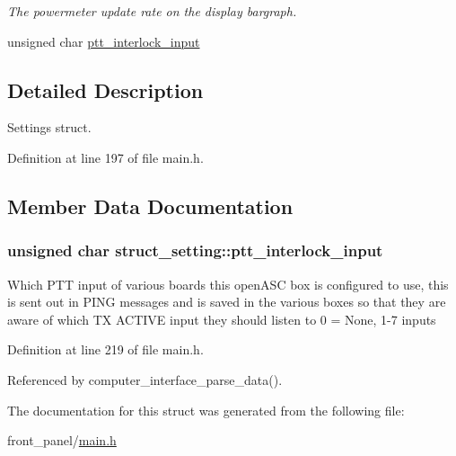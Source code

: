 \begin{CompactItemize}
\begin{CompactList}\small\item\em The powermeter update rate on the display bargraph. \item\end{CompactList}\item 
unsigned char \hyperlink{structstruct__setting_c94286afb0db3c05853e1a3a6476ae0c}{ptt\_\-interlock\_\-input}
\end{CompactItemize}


\subsection{Detailed Description}
Settings struct. 

Definition at line 197 of file main.h.

\subsection{Member Data Documentation}
\hypertarget{structstruct__setting_c94286afb0db3c05853e1a3a6476ae0c}{
\subsubsection[{ptt\_\-interlock\_\-input}]{\setlength{\rightskip}{0pt plus 5cm}unsigned char {\bf struct\_\-setting::ptt\_\-interlock\_\-input}}}
\label{structstruct__setting_c94286afb0db3c05853e1a3a6476ae0c}


Which PTT input of various boards this openASC box is configured to use, this is sent out in PING messages and is saved in the various boxes so that they are aware of which TX ACTIVE input they should listen to 0 = None, 1-7 inputs 

Definition at line 219 of file main.h.

Referenced by computer\_\-interface\_\-parse\_\-data().

The documentation for this struct was generated from the following file:\begin{CompactItemize}
\item 
front\_\-panel/\hyperlink{front__panel_2main_8h}{main.h}\end{CompactItemize}
